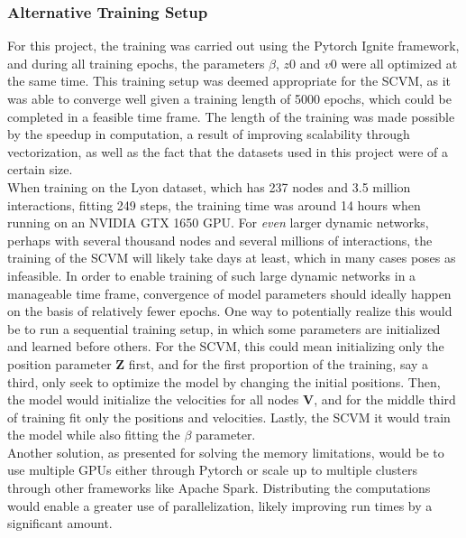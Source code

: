 \subsubsection{Alternative Training Setup}
\label{sec:Discussion:Results:AlternativeTrainingSetups}
For this project, the training was carried out using the Pytorch Ignite framework, and during all training epochs, the parameters $\beta$, $z0$ and $v0$ were all optimized at the same time.
This training setup was deemed appropriate for the SCVM, as it was able to converge well given a training length of 5000 epochs, which could be completed in a feasible time frame.
The length of the training was made possible by the speedup in computation, a result of improving scalability through vectorization, as well as the fact that the datasets used in this project were of a certain size.
\\
When training on the Lyon dataset, which has 237 nodes and 3.5 million interactions, fitting 249 steps, the training time was around 14 hours when running on an NVIDIA GTX 1650 GPU.
For \textit{even} larger dynamic networks, perhaps with several thousand nodes and several millions of interactions, the training of the SCVM will likely take days at least, which in many cases poses as infeasible. 
In order to enable training of such large dynamic networks in a manageable time frame, convergence of model parameters should ideally happen on the basis of relatively fewer epochs.
One way to potentially realize this would be to run a sequential training setup, in which some parameters are initialized and learned before others.
For the SCVM, this could mean initializing only the position parameter $\textbf{Z}$ first, and for the first proportion of the training, say a third, only seek to optimize the model by changing the initial positions.
Then, the model would initialize the velocities for all nodes $\textbf{V}$, and for the middle third of training fit only the positions and velocities. 
Lastly, the SCVM it would train the model while also fitting the $\beta$ parameter.
\\
Another solution, as presented for solving the memory limitations, would be to use multiple GPUs either through Pytorch or scale up to multiple clusters through other frameworks like Apache Spark\cite{ApacheAnalytics}.
Distributing the computations would enable a greater use of parallelization, likely improving run times by a significant amount.

